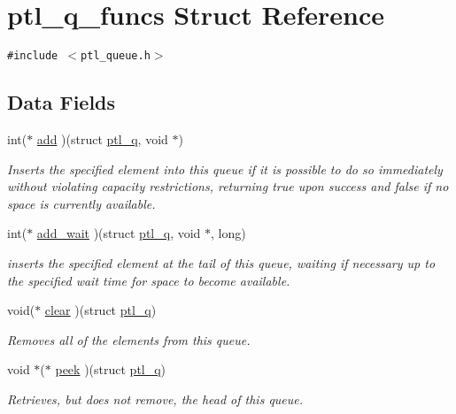 \hypertarget{structptl__q__funcs}{
\section{ptl\_\-q\_\-funcs Struct Reference}
\label{structptl__q__funcs}
}
{\tt \#include $<$ptl\_\-queue.h$>$}

\subsection*{Data Fields}
\begin{CompactItemize}
\item 
int($\ast$ \hyperlink{structptl__q__funcs_7a825aba959301d3d51e1b397e4b4569}{add} )(struct \hyperlink{structptl__q}{ptl\_\-q}, void $\ast$)
\begin{CompactList}\small\item\em Inserts the specified element into this queue if it is possible to do so immediately without violating capacity restrictions, returning true upon success and false if no space is currently available. \item\end{CompactList}\item 
int($\ast$ \hyperlink{structptl__q__funcs_9b5b84b8bfd46f1c284339c6a33be29e}{add\_\-wait} )(struct \hyperlink{structptl__q}{ptl\_\-q}, void $\ast$, long)
\begin{CompactList}\small\item\em inserts the specified element at the tail of this queue, waiting if necessary up to the specified wait time for space to become available. \item\end{CompactList}\item 
void($\ast$ \hyperlink{structptl__q__funcs_edefac643e9f7206be76e0aeede68e0a}{clear} )(struct \hyperlink{structptl__q}{ptl\_\-q})
\begin{CompactList}\small\item\em Removes all of the elements from this queue. \item\end{CompactList}\item 
void $\ast$($\ast$ \hyperlink{structptl__q__funcs_c58092f69ff82e52e3fbb8cf31eb2adc}{peek} )(struct \hyperlink{structptl__q}{ptl\_\-q})
\begin{CompactList}\small\item\em Retrieves, but does not remove, the head of this queue. \item\end{CompactList}\item 

\end{CompactItemize}
